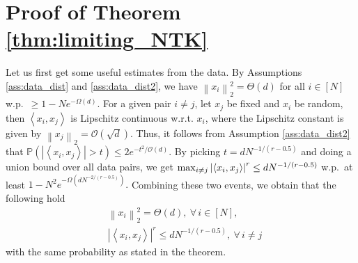 \documentclass[11pt]{article}
\def\RR{\mathbb{R}}
\newcommand{\E}{\mathbb{E}}
\newtheorem{lemma}[theorem]{Lemma}
\newenvironment{proof}{\par\noindent{\bf Proof:\ }}{\hfill$\Box$\\[2mm]}
\newcommand{\bigO}[1]{\mathcal{O}\left(#1\right)}
\newcommand{\bigOmg}[1]{\Omega\left(#1\right)}
\newcommand{\inner}[1]{\left\langle#1\right\rangle}
\newcommand{\bigexp}[1]{\exp\left(#1\right)}
\newcommand{\norm}[1]{\left\|#1\right\|}
\newcommand{\abs}[1]{\left|#1\right|}
\def\PP{\mathbb{P}}
\def\min{\mathop{\rm min}\nolimits}
\def\max{\mathop{\rm max}\nolimits}
\begin{document}



\section{Proof of Theorem \ref{thm:limiting_NTK}}\label{app:prooflim}
    Let us first get some useful estimates from the data.
    By Assumptions \ref{ass:data_dist} and \ref{ass:data_dist2}, 
    we have $\norm{x_i}_2^{2}=\Theta(d)$ for all $i\in[N]$ w.p.\ $\geq 1-Ne^{-\bigOmg{d}}.$
    For a given pair $i\neq j$, let $x_j$ be fixed and $x_i$ be random, then $\inner{x_i,x_j}$ is Lipschitz continuous w.r.t. $x_i$, 
    where the Lipschitz constant is given by 
    $\norm{x_j}_2=\mathcal{O}(\sqrt{d}).$
    Thus, it follows from Assumption \ref{ass:data_dist2} that $\PP(\abs{\inner{x_i,x_j}} > t)\leq 2e^{-t^2/\bigO{d}}.$
    By picking $t=d N^{-1/(r-0.5)}$ and doing a union bound over all data pairs, we get
    $\max_{i\neq j}\abs{\inner{x_i,x_j}}^r\leq d N^{-1/(r-0.5)}$ w.p.\ at least $1-N^2e^{-\bigOmg{dN^{-2/(r-0.5)}}}.$
    Combining these two events, we obtain that the following hold
    \begin{align}\label{eq:data_estimates}
	&\norm{x_i}_2^2=\Theta(d),\ \forall\,i\in[N],\nonumber \\
	&\abs{\inner{x_i,x_j}}^r\leq d N^{-1/(r-0.5)},\ \forall\,i\neq j 
    \end{align}
    with the same probability as stated in the theorem.
\end{document}
